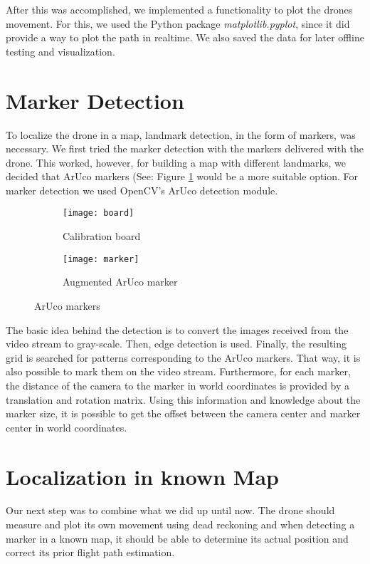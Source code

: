 \documentclass[12pt]{article}
\begin{document}
After this was accomplished, we implemented a functionality to plot the drones movement. For this, we used the Python package \textit{matplotlib.pyplot}, since it did provide a way to plot the path in realtime. We also saved the data for later offline testing and visualization.

\section{Marker Detection} \label{sec:Marker}
To localize the drone in a map, landmark detection, in the form of markers, was necessary. We first tried the marker detection with the markers delivered with the drone. This worked, however, for building a map with different landmarks, we decided that ArUco markers (See: Figure \ref{fig:ArUco} would be a more suitable option. For marker detection we used OpenCV's ArUco detection module.

\begin{figure}[htbp]
  	\centering
  	\begin{subfigure}[b]{0.45\textwidth}
  		\centering
		\texttt{[image: board]}
		 \caption{Calibration board}
	\end{subfigure}
	\begin{subfigure}[b]{0.45\textwidth}
		\centering
		\texttt{[image: marker]}
		\caption{Augmented ArUco marker}
	\end{subfigure}
	\caption{ArUco markers}
  	\label{fig:ArUco}
\end{figure}

The basic idea behind the detection is to convert the images received from the video stream to gray-scale. Then, edge detection is used. Finally, the resulting grid is searched for patterns corresponding to the ArUco markers. That way, it is also possible to mark them on the video stream. Furthermore, for each marker, the distance of the camera to the marker in world coordinates is provided by a translation and rotation matrix. Using this information and knowledge about the marker size, it is possible to get the offset between the camera center and marker center in world coordinates.

\section{Localization in known Map} \label{sec:KnownMap}
Our next step was to combine what we did up until now. The drone should measure and plot its own movement using dead reckoning and when detecting a marker in a known map, it should be able to determine its actual position and correct its prior flight path estimation.
\end{document}
